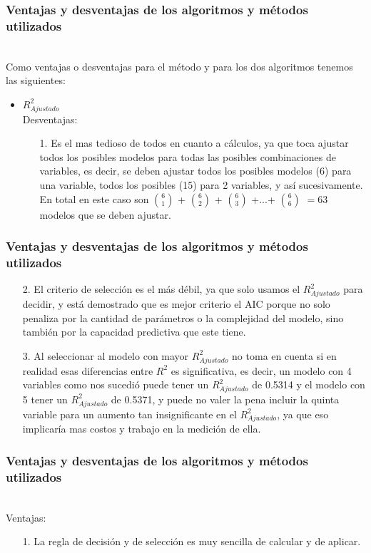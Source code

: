 \documentclass[12pt]{beamer}
\begin{document}
\begin{frame}
\frametitle{Ventajas y desventajas de los algoritmos y métodos utilizados}
~\\Como ventajas o desventajas para el método y para los dos algoritmos tenemos las siguientes:
\begin{itemize}
\item $R^2_{Ajustado}$
~\\Desventajas:
\begin{itemize}
\item[1.] Es el mas tedioso de todos en cuanto a cálculos, ya que toca ajustar todos los posibles modelos para todas las posibles combinaciones de variables, es decir, se deben ajustar todos los posibles modelos (6) para una variable, todos los posibles (15) para 2 variables, y así sucesivamente. En total en este caso son $6 \choose 1$ + $ 6 \choose 2$ + $ 6\choose 3$ +...+ $6\choose 6$ $=63$ modelos que se deben ajustar.
\end{itemize}
\end{itemize}
\end{frame}

\begin{frame}
\frametitle{Ventajas y desventajas de los algoritmos y métodos utilizados}
\begin{itemize}
\item[2.] El criterio de selección es el más débil, ya que solo usamos el $R^2_{Ajustado}$ para decidir, y está demostrado que es mejor criterio el AIC porque no solo penaliza por la cantidad de parámetros o la complejidad del modelo, sino también por la capacidad predictiva que este tiene.
\item[3.] Al seleccionar al modelo con mayor $R^2_{Ajustado}$ no toma en cuenta si en realidad esas diferencias entre $R^2$ es significativa, es decir, un modelo con 4 variables como nos sucedió puede tener un $R^2_{Ajustado}$ de 0.5314 y el modelo con 5 tener un $R^2_{Ajustado}$ de 0.5371, y puede no valer la pena incluir la quinta variable para un aumento tan insignificante en el $R^2_{Ajustado}$, ya que eso implicaría mas costos y trabajo en la medición de ella.   
\end{itemize}
\end{frame}

\begin{frame}
\frametitle{Ventajas y desventajas de los algoritmos y métodos utilizados}
~\\ Ventajas:
\begin{itemize}
\item[1.] La regla de decisión y de selección es muy sencilla de calcular y de aplicar.
\end{itemize}
\end{frame}
\end{document}
